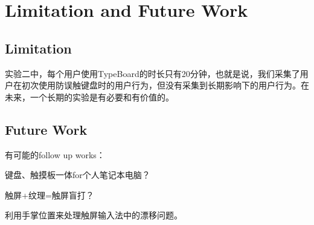 \section{Limitation and Future Work}

\subsection{Limitation}

实验二中，每个用户使用TypeBoard的时长只有20分钟，也就是说，我们采集了用户在初次使用防误触键盘时的用户行为，但没有采集到长期影响下的用户行为。在未来，一个长期的实验是有必要和有价值的。

\subsection{Future Work}

有可能的follow up works：

键盘、触摸板一体for个人笔记本电脑？

触屏+纹理=触屏盲打？

利用手掌位置来处理触屏输入法中的漂移问题。
